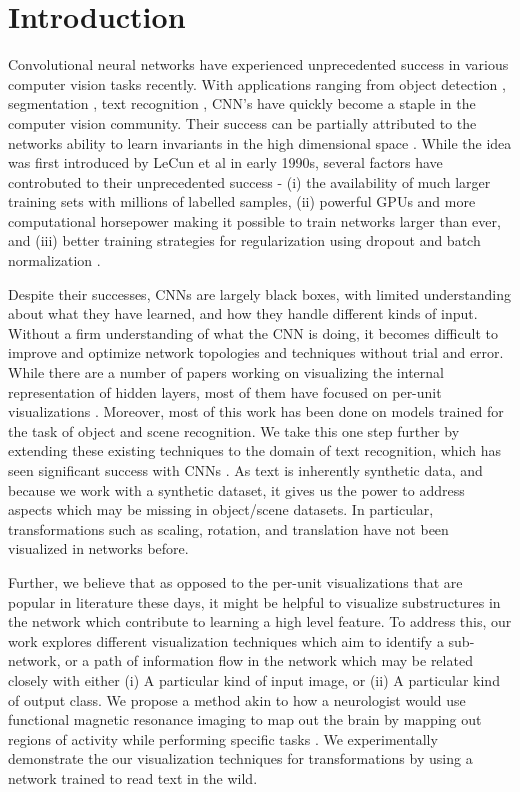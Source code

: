 \documentclass[10pt,twocolumn,letterpaper]{article}
\begin{document}
\section{Introduction}
Convolutional neural networks have experienced unprecedented success in various computer vision tasks recently.  With applications ranging from object detection \cite{krizhevskynips12}, segmentation \cite{DBLP:journals/corr/GirshickDDM13}, text recognition \cite{Jaderberg14d}, CNN's have quickly become a staple in the computer vision community. Their success can be partially attributed to the networks ability to learn invariants in the high dimensional space \cite{bengio2013representation}. While the idea was first introduced by LeCun et al in early 1990s, several factors have controbuted to their unprecedented success - (i) the availability of much larger training sets with millions of labelled samples, (ii) powerful GPUs and more computational horsepower making it possible to train networks larger than ever, and (iii) better training strategies for regularization using dropout \cite{wan2013regularization} and batch normalization \cite{ioffe2015batch}.


Despite their successes, CNNs are largely black boxes, with limited understanding about what they have learned, and how they handle different kinds of input. Without a firm understanding of what the CNN is doing, it becomes difficult to improve and optimize network topologies and techniques without trial and error. While there are a number of papers working on visualizing the internal representation of hidden layers, most of them have focused on per-unit visualizations \cite{yosinski2015understanding,mahendran2015understanding,zhou2014object}. Moreover, most of this work has been done on models trained for the task of object and scene recognition. We take this one step further by extending these existing techniques to the domain of text recognition, which has seen significant success with CNNs \cite{Jaderberg14,Jaderberg14c,Jaderberg14d}. As text is inherently synthetic data, and because we work with a synthetic dataset, it gives us the power to address aspects which may be missing in object/scene datasets. In particular, transformations such as scaling, rotation, and translation have not been visualized in networks before.


Further, we believe that as opposed to the per-unit visualizations that are popular in literature these days, it might be helpful to visualize substructures in the network which contribute to learning a high level feature. To address this, our work explores different visualization techniques which aim to identify a sub-network, or a path of information flow in the network which may be related closely with either (i) A particular kind of input image, or (ii) A particular kind of output class. We propose a method akin to how a neurologist would use functional magnetic resonance imaging to map out the brain by mapping out regions of activity while performing specific tasks \cite{friston1998event}. We experimentally demonstrate the our visualization techniques for transformations by using a network trained to read text in the wild.
\end{document}
